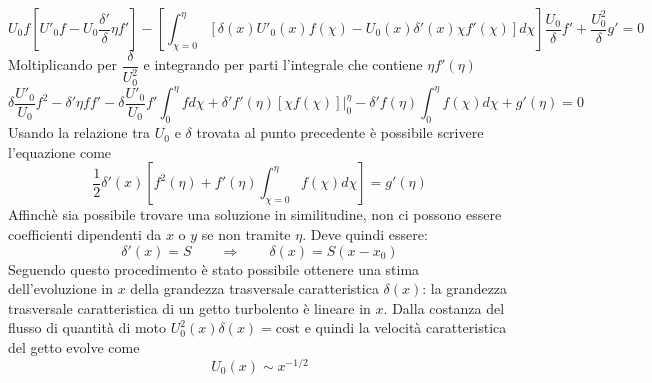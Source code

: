 \begin{itemize}
\begin{equation}
 U_0 f \left[ U'_0 f - U_0 \dfrac{\delta'}{\delta} \eta f' \right]
 - \left[ \int_{\chi=0}^\eta \left[ \delta(x) U'_0 (x) f(\chi)
 - U_0(x) \delta'(x) \chi f'(\chi) \right]d \chi \right]
 \dfrac{U_0}{\delta} f' + \dfrac{U_0^2}{\delta} g' = 0
\end{equation}
Moltiplicando per $\dfrac{\delta}{U_0^2}$ e integrando per parti
 l'integrale che contiene $\eta f'(\eta)$
\begin{equation}
 \delta\dfrac{U'_0}{U_0} f^2 - \delta' \eta f f' 
- \delta\dfrac{U'_0}{U_0} f' \int_0^\eta f d \chi
+ \delta' f'(\eta) \left[ \chi f(\chi) \right]\bigg|_0^\eta
- \delta'  f(\eta)\int_0^\eta f(\chi)d\chi + g'(\eta) = 0
\label{eq:sim}
\end{equation}
 Usando la relazione tra $U_0$  e $\delta$ trovata al punto precedente
 è possibile scrivere l'equazione come
\begin{equation}
 \dfrac{1}{2} \delta'(x) \left[ f^2(\eta)
 + f'(\eta)\int_{\chi=0}^{\eta} f(\chi) d\chi  \right] = g'(\eta) 
\end{equation}
Affinchè sia possibile trovare una soluzione in similitudine, non ci
 possono essere coefficienti dipendenti da $x$ o $y$ se non tramite
 $\eta$. Deve quindi essere:
\begin{equation}
 \delta'(x) = S \qquad \Rightarrow \qquad \delta(x) = S (x-x_0)
\end{equation}
Seguendo questo procedimento è stato possibile ottenere una stima 
 dell'evoluzione in $x$ della grandezza trasversale caratteristica
 $\delta(x)$: la grandezza trasversale caratteristica di un getto
 turbolento è lineare in $x$. Dalla costanza del flusso di 
 quantità di moto $U_0^2(x)\delta(x) = \text{cost}$ e quindi la 
 velocità caratteristica del getto evolve come
 \begin{equation}
  U_0(x) \sim x^{-1/2}
 \end{equation}


\end{itemize}
